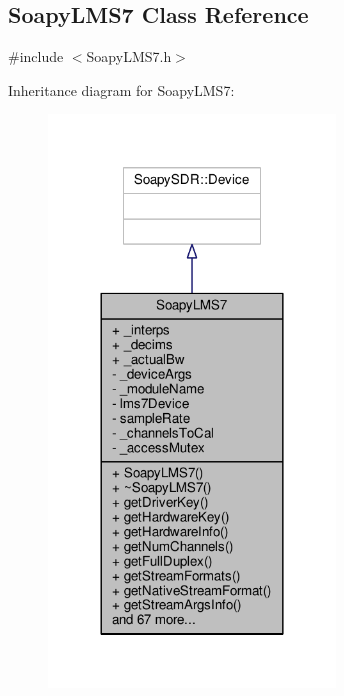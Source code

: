 \subsection{Soapy\+L\+M\+S7 Class Reference}
\label{classSoapyLMS7}


{\ttfamily \#include $<$Soapy\+L\+M\+S7.\+h$>$}



Inheritance diagram for Soapy\+L\+M\+S7\+:
\nopagebreak
\begin{figure}[H]
\begin{center}
\leavevmode
\includegraphics[width=216pt]{d0/d6f/classSoapyLMS7__inherit__graph}
\end{center}
\end{figure}


